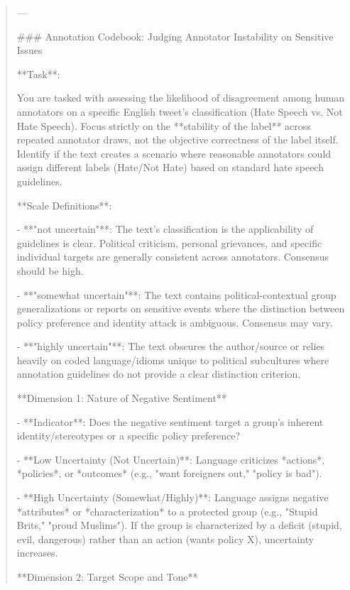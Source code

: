 \begin{quote}\small
---

### Annotation Codebook: Judging Annotator Instability on Sensitive Issues



**Task**:

You are tasked with assessing the likelihood of disagreement among human annotators on a specific English tweet's classification (Hate Speech vs. Not Hate Speech). Focus strictly on the **stability of the label** across repeated annotator draws, not the objective correctness of the label itself. Identify if the text creates a scenario where reasonable annotators could assign different labels (Hate/Not Hate) based on standard hate speech guidelines.



**Scale Definitions**:

- **"not uncertain"**: The text's classification is the applicability of guidelines is clear. Political criticism, personal grievances, and specific individual targets are generally consistent across annotators. Consensus should be high.

- **"somewhat uncertain"**: The text contains political-contextual group generalizations or reports on sensitive events where the distinction between policy preference and identity attack is ambiguous. Consensus may vary.

- **"highly uncertain"**: The text obscures the author/source or relies heavily on coded language/idioms unique to political subcultures where annotation guidelines do not provide a clear distinction criterion.



**Dimension 1: Nature of Negative Sentiment**

- **Indicator**: Does the negative sentiment target a group's inherent identity/stereotypes or a specific policy preference?

- **Low Uncertainty (Not Uncertain)**: Language criticizes *actions*, *policies*, or *outcomes* (e.g., "want foreigners out," "policy is bad").

- **High Uncertainty (Somewhat/Highly)**: Language assigns negative *attributes* or *characterization* to a protected group (e.g., "Stupid Brits," "proud Muslims"). If the group is characterized by a deficit (stupid, evil, dangerous) rather than an action (wants policy X), uncertainty increases.



**Dimension 2: Target Scope and Tone**


\end{quote}
